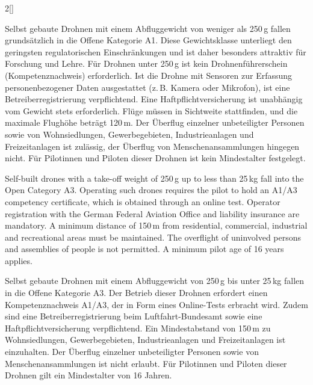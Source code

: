 \begin{paracol}{2}[]
\colger

Selbst gebaute Drohnen mit einem Abfluggewicht von weniger als 250\,g fallen grundsätzlich in die Offene Kategorie A1. Diese Gewichtsklasse unterliegt den geringsten regulatorischen Einschränkungen und ist daher besonders attraktiv für Forschung und Lehre. Für Drohnen unter 250\,g ist kein Drohnenführerschein (Kompetenznachweis) erforderlich. Ist die Drohne mit Sensoren zur Erfassung personenbezogener Daten ausgestattet (z.\,B. Kamera oder Mikrofon), ist eine Betreiberregistrierung verpflichtend. Eine Haftpflichtversicherung ist unabhängig vom Gewicht stets erforderlich. Flüge müssen in Sichtweite stattfinden, und die maximale Flughöhe beträgt 120\,m. Der Überflug einzelner unbeteiligter Personen sowie von Wohnsiedlungen, Gewerbegebieten, Industrieanlagen und Freizeitanlagen ist zulässig, der Überflug von Menschenansammlungen hingegen nicht. Für Pilotinnen und Piloten dieser Drohnen ist kein Mindestalter festgelegt.

\coleng

Self-built drones with a take-off weight of 250\,g up to less than 25\,kg fall into the Open Category A3. Operating such drones requires the pilot to hold an A1/A3 competency certificate, which is obtained through an online test. Operator registration with the German Federal Aviation Office and liability insurance are mandatory. A minimum distance of 150\,m from residential, commercial, industrial and recreational areas must be maintained. The overflight of uninvolved persons and assemblies of people is not permitted. A minimum pilot age of 16 years applies.

\colger

Selbst gebaute Drohnen mit einem Abfluggewicht von 250\,g bis unter 25\,kg fallen in die Offene Kategorie A3. Der Betrieb dieser Drohnen erfordert einen Kompetenznachweis A1/A3, der in Form eines Online-Tests erbracht wird. Zudem sind eine Betreiberregistrierung beim Luftfahrt-Bundesamt sowie eine Haftpflichtversicherung verpflichtend. Ein Mindestabstand von 150\,m zu Wohnsiedlungen, Gewerbegebieten, Industrieanlagen und Freizeitanlagen ist einzuhalten. Der Überflug einzelner unbeteiligter Personen sowie von Menschenansammlungen ist nicht erlaubt. Für Pilotinnen und Piloten dieser Drohnen gilt ein Mindestalter von 16 Jahren.

\colende


\end{paracol}
